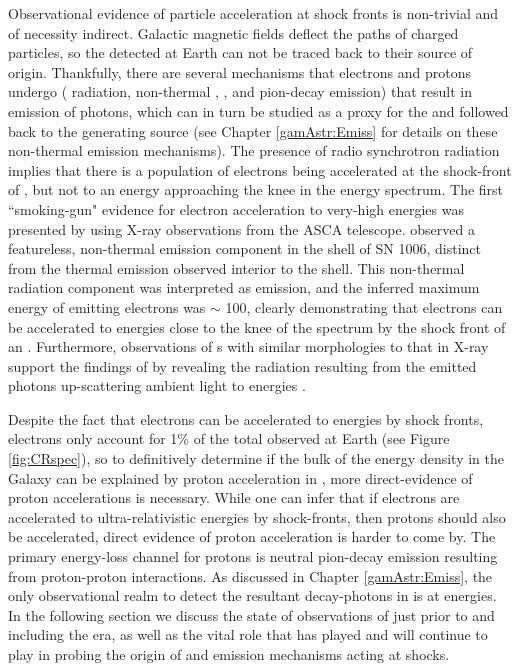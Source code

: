 Observational evidence of particle acceleration at \snr{} shock fronts is non-trivial and of necessity indirect. Galactic magnetic fields deflect the paths of charged particles, so the \crs{} detected at Earth can not be traced back to their source of origin. Thankfully, there are several mechanisms that electrons and protons undergo (\ie{} \sync{} radiation, non-thermal \brems{}, \ic{}, and pion-decay emission) that result in emission of photons, which can in turn be studied as a proxy for the \crs{} and followed back to the generating source (see Chapter \ref{gamAstr:Emiss} for details on these non-thermal emission mechanisms). The presence of radio synchrotron radiation implies that there is a population of electrons being accelerated at the shock-front of \snrs{}, but not to an energy approaching the knee in the \cray{} energy spectrum. The first ``smoking-gun" evidence for electron acceleration to very-high energies was presented by \cite{Koyama95} using X-ray observations from the ASCA telescope. \cite{Koyama95} observed a featureless, non-thermal emission component in the shell of SN 1006, distinct from the thermal emission observed interior to the shell. This non-thermal radiation component was interpreted as \sync{} emission, and the inferred maximum energy of emitting electrons was $\sim $ 100\tev{}, clearly demonstrating that electrons can be accelerated to \cray{} energies close to the knee of the \cray{} spectrum by the shock front of an \snr{}. Furthermore,  \snr{} observations of \tev{}  \gam{}s with similar morphologies to that in X-ray support the findings of \cite{Koyama95} by revealing the \ic{} radiation resulting from the \sync{} emitted photons up-scattering ambient light to \tev{} energies \cite{Tanimori98,Aharonian04}.

Despite the fact that electrons can be accelerated to \cray{} energies by \snr{} shock fronts, electrons only account for 1\% of the total \crs{} observed at Earth (see Figure \ref{fig:CRspec}), so to definitively determine if the bulk of the \cray{} energy density in the Galaxy can be explained by \cray{} proton acceleration in \snrs{}, more direct-evidence of proton accelerations is necessary. While one can infer that if electrons are accelerated to ultra-relativistic energies by \snr{} shock-fronts, then protons should also be accelerated, direct evidence of proton acceleration is harder to come by. The primary energy-loss channel for protons is neutral pion-decay emission resulting from proton-proton interactions. As discussed in Chapter \ref{gamAstr:Emiss}, the only observational realm to detect the resultant decay-photons in is at \gam{} energies. In the following section we discuss the state of \gam{} observations of \snrs{} just prior to and including the \Fermi{} era, as well as the vital role that \Fermi{} has played and will continue to play in probing the origin of \crs{} and emission mechanisms acting at \snr{} shocks.

